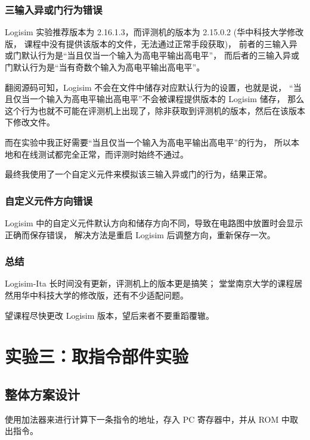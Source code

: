 \documentclass[12pt, a4paper]{ctexart}
\begin{document}
\subsubsection*{三输入异或门行为错误}

Logisim 实验推荐版本为 2.16.1.3，而评测机的版本为 2.15.0.2 (华中科技大学修改版，
课程中没有提供该版本的文件，无法通过正常手段获取)，
前者的三输入异或门默认行为是“当且仅当一个输入为高电平输出高电平”，
而后者的三输入异或门默认行为是“当有奇数个输入为高电平输出高电平”。

翻阅源码可知，Logisim 不会在文件中储存对应默认行为的设置，也就是说，
“当且仅当一个输入为高电平输出高电平”不会被课程提供版本的 Logisim 储存，
那么这个行为也就不可能在评测机上出现了，除非获取到评测机的版本，然后在该版本下修改文件。

而在实验中我正好需要“当且仅当一个输入为高电平输出高电平”的行为，
所以本地和在线测试都完全正常，而评测时始终不通过。

最终我使用了一个自定义元件来模拟该三输入异或门的行为，结果正常。

\subsubsection*{自定义元件方向错误}

Logisim 中的自定义元件默认方向和储存方向不同，导致在电路图中放置时会显示正确而保存错误，
解决方法是重启 Logisim 后调整方向，重新保存一次。

\subsubsection*{总结}

Logisim-Ita 长时间没有更新，评测机上的版本更是搞笑；
堂堂南京大学的课程居然用华中科技大学的修改版，还有不少适配问题。

望课程尽快更改 Logisim 版本，望后来者不要重蹈覆辙。

\section{实验三：取指令部件实验}

\subsection{整体方案设计}

使用加法器来进行计算下一条指令的地址，存入 PC 寄存器中，并从 ROM 中取出指令。
\end{document}

